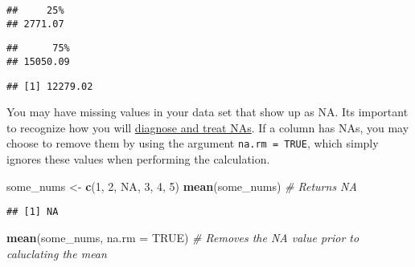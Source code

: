 \documentclass[
]{book}
\newenvironment{Shaded}{\begin{snugshade}}{\end{snugshade}}
\newcommand{\CommentTok}[1]{\textcolor[rgb]{0.56,0.35,0.01}{\textit{#1}}}
\newcommand{\DataTypeTok}[1]{\textcolor[rgb]{0.13,0.29,0.53}{#1}}
\newcommand{\DecValTok}[1]{\textcolor[rgb]{0.00,0.00,0.81}{#1}}
\newcommand{\KeywordTok}[1]{\textcolor[rgb]{0.13,0.29,0.53}{\textbf{#1}}}
\newcommand{\NormalTok}[1]{#1}
\newcommand{\OperatorTok}[1]{\textcolor[rgb]{0.81,0.36,0.00}{\textbf{#1}}}
\newcommand{\OtherTok}[1]{\textcolor[rgb]{0.56,0.35,0.01}{#1}}
\newcommand{\StringTok}[1]{\textcolor[rgb]{0.31,0.60,0.02}{#1}}
\begin{document}
\begin{verbatim}
##     25% 
## 2771.07
\end{verbatim}

\begin{Shaded}
\end{Shaded}

\begin{verbatim}
##      75% 
## 15050.09
\end{verbatim}

\begin{Shaded}
\end{Shaded}

\begin{verbatim}
## [1] 12279.02
\end{verbatim}

You may have missing values in your data set that show up as NA. Its important to recognize how you will \protect\hyperlink{completeness-na}{diagnose and treat NAs}. If a column has NAs, you may choose to remove them by using the argument \texttt{na.rm\ =\ TRUE}, which simply ignores these values when performing the calculation.

\begin{Shaded}
\begin{Highlighting}[]
\NormalTok{some_nums <-}\StringTok{ }\KeywordTok{c}\NormalTok{(}\DecValTok{1}\NormalTok{, }\DecValTok{2}\NormalTok{, }\OtherTok{NA}\NormalTok{, }\DecValTok{3}\NormalTok{, }\DecValTok{4}\NormalTok{, }\DecValTok{5}\NormalTok{)}
\KeywordTok{mean}\NormalTok{(some_nums) }\CommentTok{# Returns NA}
\end{Highlighting}
\end{Shaded}

\begin{verbatim}
## [1] NA
\end{verbatim}

\begin{Shaded}
\begin{Highlighting}[]
\KeywordTok{mean}\NormalTok{(some_nums, }\DataTypeTok{na.rm =} \OtherTok{TRUE}\NormalTok{) }\CommentTok{# Removes the NA value prior to caluclating the mean}
\end{Highlighting}
\end{Shaded}
\end{document}
